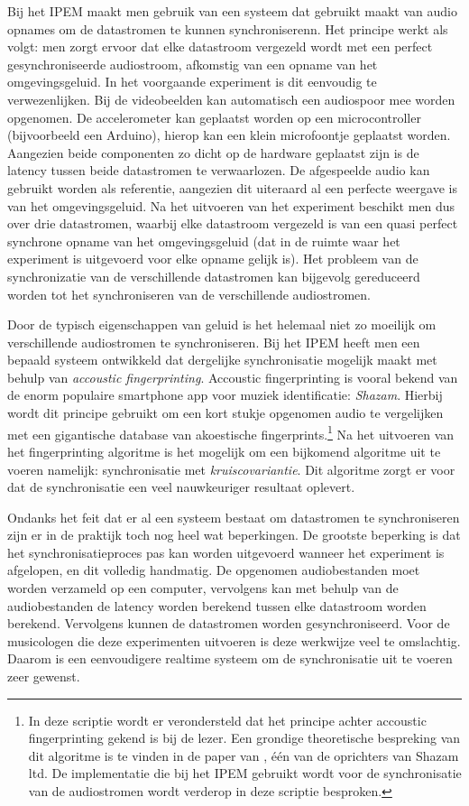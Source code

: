 Bij het IPEM maakt men gebruik van een systeem dat gebruikt maakt van audio opnames om de datastromen te kunnen synchroniserenn. Het principe werkt als volgt: men zorgt ervoor dat elke datastroom vergezeld wordt met een perfect gesynchroniseerde audiostroom, afkomstig van een opname van het omgevingsgeluid. In het voorgaande experiment is dit eenvoudig te verwezenlijken. Bij de videobeelden kan automatisch een audiospoor mee worden opgenomen. De accelerometer kan geplaatst worden op een microcontroller (bijvoorbeeld een Arduino), hierop kan een klein microfoontje geplaatst worden. Aangezien beide componenten zo dicht op de hardware geplaatst zijn is de latency tussen beide datastromen te verwaarlozen. 
De afgespeelde audio kan gebruikt worden als referentie, aangezien dit uiteraard al een perfecte weergave is van het omgevingsgeluid. Na het uitvoeren van het experiment beschikt men dus over drie datastromen, waarbij elke datastroom vergezeld is van een quasi perfect synchrone opname van het omgevingsgeluid (dat in de ruimte waar het experiment is uitgevoerd voor elke opname gelijk is). Het probleem van de synchronizatie van de verschillende datastromen kan bijgevolg gereduceerd worden tot het synchroniseren van de verschillende audiostromen.

Door de typisch eigenschappen van geluid is het helemaal niet zo moeilijk om verschillende audiostromen te synchroniseren. Bij het IPEM heeft men een bepaald systeem ontwikkeld dat dergelijke synchronisatie mogelijk maakt met behulp van \textit{accoustic fingerprinting}. Accoustic fingerprinting is vooral bekend van de enorm populaire smartphone app voor muziek identificatie: \textit{Shazam}. Hierbij wordt dit principe gebruikt om een kort stukje opgenomen audio te vergelijken met een gigantische database van akoestische fingerprints.\footnote{In deze scriptie wordt er verondersteld dat het principe achter accoustic fingerprinting gekend is bij de lezer. Een grondige theoretische bespreking van dit algoritme is te vinden in de paper van \citeauthor{Wang2003a}, één van de oprichters van Shazam ltd. De implementatie die bij het IPEM gebruikt wordt voor de synchronisatie van de audiostromen wordt verderop in deze scriptie besproken.} Na het uitvoeren van het fingerprinting algoritme is het mogelijk om een bijkomend algoritme uit te voeren namelijk: synchronisatie met \textit{kruiscovariantie}. Dit algoritme zorgt er voor dat de synchronisatie een veel nauwkeuriger resultaat oplevert.

Ondanks het feit dat er al een systeem bestaat om datastromen te synchroniseren zijn er in de praktijk toch nog heel wat beperkingen. De grootste beperking is dat het synchronisatieproces pas kan worden uitgevoerd wanneer het experiment is afgelopen, en dit volledig handmatig. De opgenomen audiobestanden moet worden verzameld op een computer, vervolgens kan met behulp van de audiobestanden de latency worden berekend tussen elke datastroom worden berekend. Vervolgens kunnen de datastromen worden gesynchroniseerd. Voor de musicologen die deze experimenten uitvoeren is deze werkwijze veel te omslachtig. Daarom is een eenvoudigere realtime systeem om de synchronisatie uit te voeren zeer gewenst.

